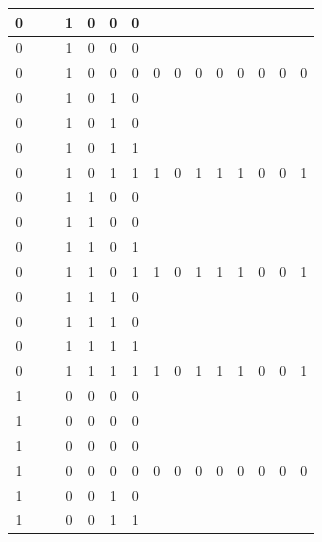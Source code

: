 \begin{table}[!tb]
\begin{tabular}{|c|c|c|c|c|c|c|c|c|c|c|c|c|c|c|}
        \rowcolor{yellow!40} 0 &  &  & 1 & 0 & 0 & 0 &  &  &  &  &  &  &  &  \\ \hline
        \rowcolor{yellow!40} 0 &  &  & 1 & 0 & 0 & 0 &  &  &  &  &  &  &  &  \\ \hline
        \rowcolor{yellow!40} 0 &  &  & 1 & 0 & 0 & 0 & 0 & 0 & 0 & 0 & 0 & 0 & 0 & 0 \\ \hline
        \rowcolor{gray!40} 0 &  &  & 1 & 0 & 1 & 0 &  &  &  &  &  &  &  &  \\ \hline
        \rowcolor{gray!40} 0 &  &  & 1 & 0 & 1 & 0 &  &  &  &  &  &  &  &  \\ \hline
        \rowcolor{gray!40} 0 &  &  & 1 & 0 & 1 & 1 &  &  &  &  &  &  &  &  \\ \hline
        \rowcolor{gray!40} 0 &  &  & 1 & 0 & 1 & 1 & 1 & 0 & 1 & 1 & 1 & 0 & 0 & 1 \\ \hline
        \rowcolor{blue!40} 0 &  &  & 1 & 1 & 0 & 0 &  &  &  &  &  &  &  &  \\ \hline
        \rowcolor{blue!40} 0 &  &  & 1 & 1 & 0 & 0 &  &  &  &  &  &  &  &  \\ \hline
        \rowcolor{blue!40} 0 &  &  & 1 & 1 & 0 & 1 &  &  &  &  &  &  &  &  \\ \hline
        \rowcolor{blue!40} 0 &  &  & 1 & 1 & 0 & 1 & 1 & 0 & 1 & 1 & 1 & 0 & 0 & 1 \\ \hline
        \rowcolor{red!40} 0 &  &  & 1 & 1 & 1 & 0 &  &  &  &  &  &  &  &  \\ \hline
        \rowcolor{red!40} 0 &  &  & 1 & 1 & 1 & 0 &  &  &  &  &  &  &  &  \\ \hline
        \rowcolor{red!40} 0 &  &  & 1 & 1 & 1 & 1 &  &  &  &  &  &  &  &  \\ \hline
        \rowcolor{red!40} 0 &  &  & 1 & 1 & 1 & 1 & 1 & 0 & 1 & 1 & 1 & 0 & 0 & 1 \\ \hline
        \rowcolor{green!40} 1 &  &  & 0 & 0 & 0 & 0 &  &  &  &  &  &  &  &  \\ \hline
        \rowcolor{green!40} 1 &  &  & 0 & 0 & 0 & 0 &  &  &  &  &  &  &  &  \\ \hline
        \rowcolor{green!40} 1 &  &  & 0 & 0 & 0 & 0 &  &  &  &  &  &  &  &  \\ \hline
        \rowcolor{green!40} 1 &  &  & 0 & 0 & 0 & 0 & 0 & 0 & 0 & 0 & 0 & 0 & 0 & 0 \\ \hline
        \rowcolor{yellow!40} 1 &  &  & 0 & 0 & 1 & 0 &  &  &  &  &  &  &  &  \\ \hline
        \rowcolor{yellow!40} 1 &  &  & 0 & 0 & 1 & 1 &  &  &  &  &  &  &  &  \\ \hline

\end{tabular}
\end{table}
